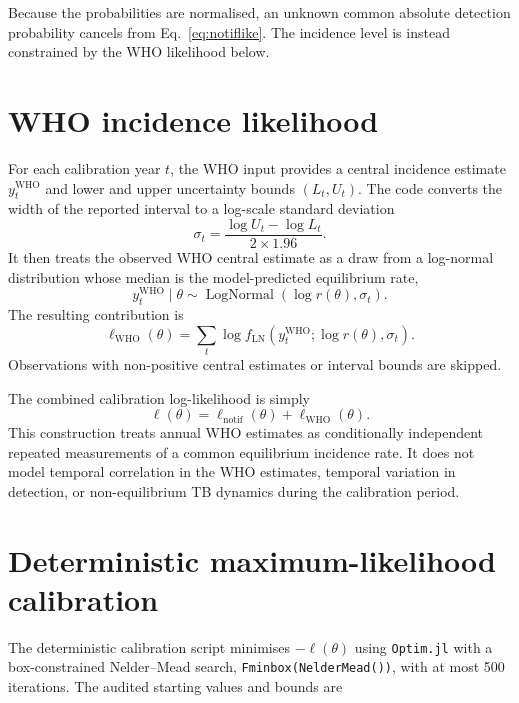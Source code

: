 \documentclass[11pt]{article}
\newcommand{\code}[1]{\texttt{#1}}
\begin{document}
Because the probabilities are normalised, an unknown common absolute detection probability cancels from Eq.~\eqref{eq:notiflike}. The incidence level is instead constrained by the WHO likelihood below.

\section{WHO incidence likelihood}

For each calibration year $t$, the WHO input provides a central incidence estimate $y_t^{\mathrm{WHO}}$ and lower and upper uncertainty bounds $(L_t,U_t)$. The code converts the width of the reported interval to a log-scale standard deviation
\begin{equation}
\sigma_t=\frac{\log U_t-\log L_t}{2\times1.96}.
\label{eq:whosigma}
\end{equation}
It then treats the observed WHO central estimate as a draw from a log-normal distribution whose median is the model-predicted equilibrium rate,
\begin{equation}
y_t^{\mathrm{WHO}}\mid\theta\sim
\operatorname{LogNormal}\left(\log r(\theta),\sigma_t\right).
\label{eq:wholike}
\end{equation}
The resulting contribution is
\begin{equation}
\ell_{\mathrm{WHO}}(\theta)=\sum_t
\log f_{\mathrm{LN}}\!\left(y_t^{\mathrm{WHO}};\log r(\theta),\sigma_t\right).
\end{equation}
Observations with non-positive central estimates or interval bounds are skipped.

The combined calibration log-likelihood is simply
\begin{equation}
\ell(\theta)=\ell_{\mathrm{notif}}(\theta)+\ell_{\mathrm{WHO}}(\theta).
\label{eq:combinedlike}
\end{equation}
This construction treats annual WHO estimates as conditionally independent repeated measurements of a common equilibrium incidence rate. It does not model temporal correlation in the WHO estimates, temporal variation in detection, or non-equilibrium TB dynamics during the calibration period.

\section{Deterministic maximum-likelihood calibration}

The deterministic calibration script minimises $-\ell(\theta)$ using \code{Optim.jl} with a box-constrained Nelder--Mead search, \code{Fminbox(NelderMead())}, with at most 500 iterations. The audited starting values and bounds are
\end{document}
